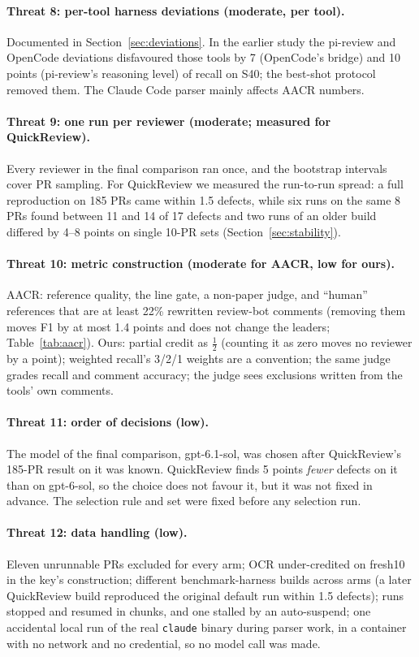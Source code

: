 \documentclass[11pt,a4paper]{article}
\newcommand{\qcr}{QuickReview}
\newcommand{\code}[1]{\texttt{#1}}
\begin{document}
\paragraph{Threat 8: per-tool harness deviations (moderate, per tool).}
Documented in Section~\ref{sec:deviations}. In the earlier study the
pi-review and OpenCode deviations disfavoured those tools by 7 (OpenCode's
bridge) and 10 points (pi-review's reasoning level)
of recall on S40; the best-shot protocol removed them. The Claude Code parser
mainly affects AACR numbers.

\paragraph{Threat 9: one run per reviewer (moderate; measured for \qcr{}).}
Every reviewer in the final comparison ran once, and the bootstrap intervals
cover PR sampling. For \qcr{} we measured the run-to-run spread: a full
reproduction on 185 PRs came within 1.5 defects, while six runs on the same
8 PRs found between 11 and 14 of 17 defects and two runs of an older build
differed by 4--8 points on single 10-PR sets (Section~\ref{sec:stability}).

\paragraph{Threat 10: metric construction (moderate for AACR, low for ours).}
AACR: reference quality, the line gate, a non-paper judge, and ``human''
references that are at least 22\% rewritten review-bot comments (removing
them moves F1 by at most 1.4 points and does not change the leaders;
Table~\ref{tab:aacr}). Ours: partial credit as $\tfrac12$ (counting it as
zero moves no reviewer by a point); weighted recall's 3/2/1 weights are a
convention; the same judge grades recall and comment accuracy; the judge sees
exclusions written from the tools' own comments.

\paragraph{Threat 11: order of decisions (low).} The model of the final
comparison, gpt-6.1-sol, was chosen after \qcr{}'s 185-PR result on it was
known. \qcr{} finds 5 points \emph{fewer} defects on it than on gpt-6-sol, so
the choice does not favour it, but it was not fixed in advance. The selection
rule and set were fixed before any selection run.

\paragraph{Threat 12: data handling (low).}
Eleven unrunnable PRs excluded for every arm; OCR under-credited on fresh10
in the key's construction; different benchmark-harness builds across arms (a
later \qcr{} build reproduced the original default run within 1.5 defects);
runs stopped and resumed in chunks, and one stalled by an auto-suspend; one
accidental local run of the real \code{claude} binary during parser work, in
a container with no network and no credential, so no model call was made.
\end{document}
